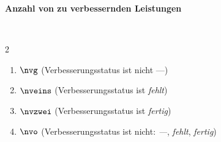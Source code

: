 \begin{enumerate}[label=\textbf{(\arabic*)}, align=left, leftmargin=*]
{	\item \textbf{Anzahl von zu verbessernden Leistungen} { \thisfontsize \mbox{} \
	\setlength{\columnsep}{-20pt}
	\begin{multicols}{2}
	\begin{enumerate}[label=\textbf{\textbullet}, align=left, leftmargin=*]
		\item[\textit{Gesamtanzahl}] $\nvg$ (Verbesserungsstatus ist nicht \glqq ---\grqq{})
		\item[\textit{fehlend}] $\nveins$ (Verbesserungsstatus ist \glqq \textit{fehlt}\grqq{})
		\item[\textit{fertig}] $\nvzwei$ (Verbesserungsstatus ist \glqq \textit{fertig}\grqq{})
		\item[\textit{nicht abgeschlossenen}] $\nvo$ (Verbesserungsstatus ist nicht: \glqq\textit{---}\grqq{}, \glqq\textit{fehlt}\grqq{}, \glqq\textit{fertig}\grqq{})
	\end{enumerate}
	\end{multicols}
	}
	\vspace*{-12pt}
	}
	

\end{enumerate}
